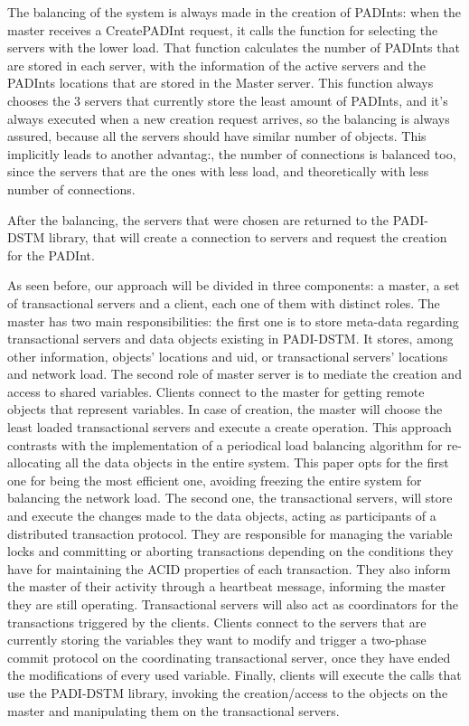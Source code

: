 \documentclass[times, 10pt,twocolumn]{article}
\begin{document}

The balancing of the system is always made in the creation of PADInts: when the master receives a CreatePADInt request, it calls the function for selecting the servers with the lower load. That function calculates the number of PADInts that are stored in each server, with the information of the active servers and the PADInts locations that are stored in the Master server. This function always chooses the 3 servers that currently store the least amount of PADInts, and it's always executed when a new creation request arrives, so the balancing is always assured, because all the servers should have similar number of objects. This implicitly leads to another advantag:, the number of connections is balanced too, since the servers that are the ones with less load, and theoretically with less number of connections.

After the balancing, the servers that were chosen are returned to the PADI-DSTM library, that will create a connection to servers and request the creation for the PADInt.


As seen before, our approach will be divided in three components: a master, a set of transactional servers and a client, each one of them with distinct roles.
The master has two main responsibilities: the first one is to store meta-data regarding transactional servers and data objects existing in PADI-DSTM. It stores, among other information, objects' locations and uid, or transactional servers' locations and network load. The second role of master server is to mediate the creation and access to shared variables. Clients connect to the master for getting remote objects that represent variables. In case of creation, the master will choose the least loaded transactional servers and execute a create operation. This approach contrasts with the implementation of a periodical load balancing algorithm for re-allocating all the data objects in the entire system. This paper opts for the first one for being the most efficient one, avoiding freezing the entire system for balancing the network load.
The second one, the transactional servers, will store and execute the changes made to the data objects, acting as participants of a distributed transaction protocol. They are responsible for managing the variable locks and committing or aborting transactions depending on the conditions they have for maintaining the ACID properties of each transaction. They also inform the master of their activity through a heartbeat message, informing the master they are still operating. Transactional servers will also act as coordinators for the transactions triggered by the clients. Clients connect to the servers that are currently storing the variables they want to modify and trigger a two-phase commit protocol on the coordinating transactional server, once they have ended the modifications of every used variable.
Finally, clients will execute the calls that use the PADI-DSTM library, invoking the creation/access to the objects on the master and manipulating them on the transactional servers.
\end{document}
